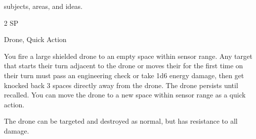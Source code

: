 subjects, areas, and ideas.

2 SP


Drone, Quick Action


You fire a large shielded drone to an empty space within sensor range. Any target that starts their
turn adjacent to the drone or moves their for the first time on their turn must pass an engineering
check or take 1d6 energy damage, then get knocked back 3 spaces directly away from the
drone. The drone persists until recalled. You can move the drone to a new space within sensor
range as a quick action.


The drone can be targeted and destroyed as normal, but has resistance to all damage.
